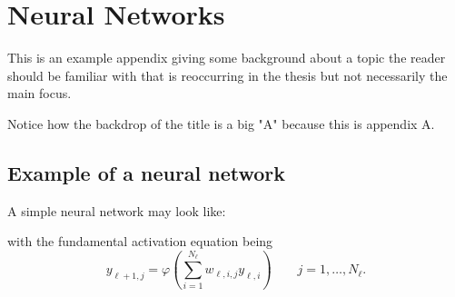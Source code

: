 \chapter{Neural Networks}\label{apx:neuralnetworks}
This is an example appendix giving some background about a topic the reader should be familiar with that is reoccurring in the thesis but not necessarily the main focus.

Notice how the backdrop of the title is a big "A" because this is appendix A.

\section{Example of a neural network}
A simple neural network may look like:
\begin{center}
\begin{neuralnetwork}[height=5]  %
    \hiddenlayer[count=4, bias=false] \linklayers
    \hiddenlayer[count=5, bias=false] \linklayers
    \hiddenlayer[count=4, bias=false] \linklayers
    \hiddenlayer[count=3, bias=true] \linklayers
    \outputlayer[count=1] \linklayers
\end{neuralnetwork}
\end{center}
with the fundamental activation equation being
\begin{equation}
	y_{\ell+1,j} = \varphi\left(\sum_{i=1}^{N_\ell} w_{\ell,i,j} y_{\ell,i} \right)  \qquad  j = 1, \hdots, N_\ell.
\end{equation}

